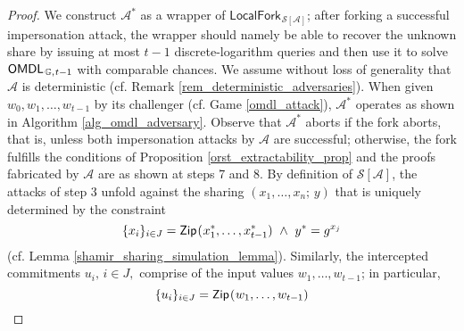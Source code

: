 \documentclass{iacrtrans}
\begin{document}
\begin{proof}
We construct $\mathcal{A}^*$ as a wrapper of
$
\mathsf{LocalFork}_{
		\hspace{1pt}
    	\mathcal{S}\hspace{0pt}[
    		\hspace{0pt}
    		\mathcal{A}
    		\hspace{0pt}
    	]
    }
$;
after forking a successful impersonation attack,
the wrapper should namely be able to recover the unknown share
by issuing at most $t-1$ discrete-logarithm queries
and then use it to solve
$\mathsf{OMDL}_{\hspace{1pt}\mathbb{G},\hspace{0.5pt} t-1}$
with comparable chances.
We assume without loss of generality that $\mathcal{A}$
is deterministic (cf. Remark \ref{rem_deterministic_adversaries}).
When given $w_0, w_1, \dots, w_{t-1}$
by its challenger
(cf. Game \ref{omdl_attack}),
$\mathcal{A}^*$ operates as
shown in Algorithm \ref{alg_omdl_adversary}.
Observe that $\mathcal{A}^*$
aborts if the fork aborts,
that is, unless both impersonation attacks by $\mathcal{A}$
are successful;
otherwise, the fork fulfills the conditions of
Proposition \ref{orst_extractability_prop}
and the proofs fabricated by $\mathcal{A}$
are as shown at steps 7 and 8.
By definition of
$\mathcal{S}\hspace{0pt}[
 	\hspace{0pt}
    \mathcal{A}
    \hspace{0pt}
    ]
$,
the attacks of step 3
unfold against the sharing $(x_1, \dots, x_n;\hspace{2pt} y)$
that is uniquely determined by the constraint
\vspace{5pt}
\begin{equation}\label{mt_1}
\{x_i\}_{i \in J} =
\mathsf{Zip}\hspace{0.75pt}
(\hspace{0.5pt}x_1^*, \dots, x_{t-1}^*)
\ \land
\ y^* = g ^ {x_j}
\vspace{5pt}
\end{equation}
(cf. Lemma \ref{shamir_sharing_simulation_lemma}).
Similarly, the intercepted commitments
$u_i,\hspace{2pt} i \in J,$
comprise of the input values $w_1, \dots, w_{t-1}$;
in particular,
\vspace{3pt}
\begin{equation}\label{mt_2}
\{u_i\}_{i \in J} =
\mathsf{Zip}\hspace{0.75pt}
(\hspace{0.5pt}w_1, \dots, w_{t-1})

\end{equation}
\end{proof}
\end{document}
